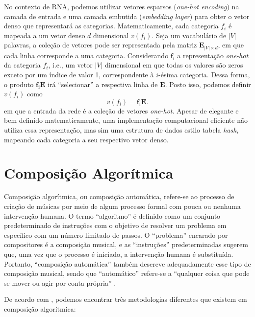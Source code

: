 \documentclass{automatextcc}
\newcommand{\bs}[1]{\boldsymbol{#1}}
\begin{document}
No contexto de RNA, podemos utilizar vetores esparsos (\textit{one-hot encoding}) na camada de entrada e uma camada embutida (\textit{embedding layer}) para obter o vetor denso que representará as categorias. Matematicamente, cada categoria $f_i$ é mapeada a um vetor denso $d$ dimensional $v(f_i)$. Seja um vocabulário de $|V|$ palavras, a coleção de vetores pode ser representada pela matriz $\bs{E}_{|V| \times d}$, em que cada linha corresponde a uma categoria. Considerando $\bs{f_i}$ a representação \textit{one-hot} da categoria $f_i$, i.e., um vetor $|V|$ dimensional em que todas os valores são zeros exceto por um índice de valor 1, correspondente à $i$-ésima categoria. Dessa forma, o produto $\bs{f_i E}$ irá ``selecionar'' a respectiva linha de $\bs{E}$. Posto isso, podemos definir $v(f_i)$ como
\begin{equation}
    v(f_i) = \bs{f_i E}.
\end{equation}
em que a entrada da rede é a coleção de vetores \textit{one-hot}. Apesar de elegante e bem definido matematicamente, uma implementação computacional eficiente não utiliza essa representação, mas sim uma estrutura de dados estilo tabela \textit{hash}, mapeando cada categoria a seu respectivo vetor denso.
\citep{goldberg2017}



\section{Composição Algorítmica}
Composição algorítmica, ou composição automática, refere-se ao processo de criação de músicas por meio de algum processo formal com pouca ou nenhuma intervenção humana. O termo ``algoritmo'' é definido como um conjunto predeterminado de instruções com o objetivo de resolver um problema em específico com um número limitado de passos. O ``problema'' encarado por compositores é a composição musical, e as ``instruções'' predeterminadas sugerem que, uma vez que o processo é iniciado, a intervenção humana é substituída. Portanto, ``composição automática'' também descreve adequadamente esse tipo de composição musical, sendo que ``automático'' refere-se a ``qualquer coisa que pode se mover ou agir por conta própria'' \citep{alpern1995, maurer}.

De acordo com \citet{maurer}, podemos encontrar três metodologias diferentes que existem em composição algorítmica: 
\end{document}
